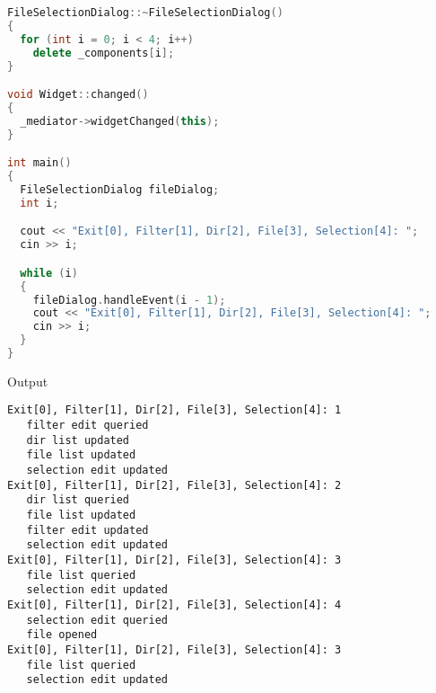 \documentclass{book}
\begin{document}
\begin{lstlisting}[caption={Mediator Pattern Sample 3},language=C++]
FileSelectionDialog::~FileSelectionDialog()
{
  for (int i = 0; i < 4; i++)
    delete _components[i];
}

void Widget::changed()
{
  _mediator->widgetChanged(this);
}

int main()
{
  FileSelectionDialog fileDialog;
  int i;

  cout << "Exit[0], Filter[1], Dir[2], File[3], Selection[4]: ";
  cin >> i;

  while (i)
  {
    fileDialog.handleEvent(i - 1);
    cout << "Exit[0], Filter[1], Dir[2], File[3], Selection[4]: ";
    cin >> i;
  }
}
\end{lstlisting}
Output

\begin{verbatim}
Exit[0], Filter[1], Dir[2], File[3], Selection[4]: 1
   filter edit queried
   dir list updated
   file list updated
   selection edit updated
Exit[0], Filter[1], Dir[2], File[3], Selection[4]: 2
   dir list queried
   file list updated
   filter edit updated
   selection edit updated
Exit[0], Filter[1], Dir[2], File[3], Selection[4]: 3
   file list queried
   selection edit updated
Exit[0], Filter[1], Dir[2], File[3], Selection[4]: 4
   selection edit queried
   file opened
Exit[0], Filter[1], Dir[2], File[3], Selection[4]: 3
   file list queried
   selection edit updated
\end{verbatim}
\end{document}

